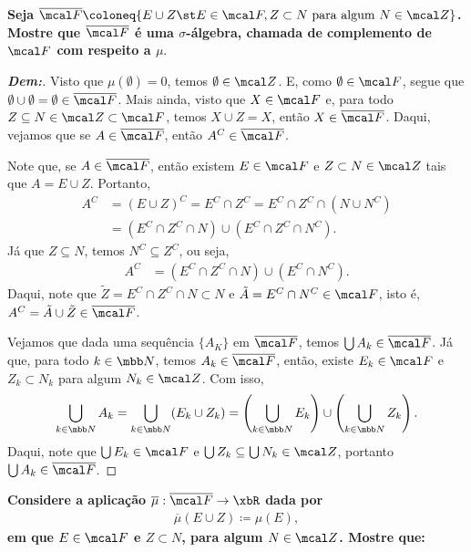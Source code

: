 \biglinend 
{}
\myexe{\thedois}
\bigline
\textbf{Seja $\overline{\mcal F} \coloneq \{E\cup Z\st E \in \mcal F, Z \subset N\text{ para algum }N\in \mcal Z\}$.
Mostre que $\overline{\mcal F}$ é uma $\sigma$-álgebra, chamada de complemento de $\mcal F$ com respeito a $\mu$}.
\begin{proof}[\textbf{Dem:}]
Visto que $\mu(\emptyset) = 0$, temos $\emptyset \in \mcal Z$. E, como $\emptyset \in \mcal F$, segue que 
  $\emptyset \cup \emptyset = \emptyset \in \overline{\mcal F}$. Mais ainda, visto que $X \in \mcal F$ e, 
  para todo $Z \subseteq N \in \mcal Z \subset \mcal F$, temos $X \cup Z = X$, então $X \in \overline{\mcal F}$. 
  Daqui, vejamos que se $A \in \overline{\mcal F}$, então $A^C \in \overline{\mcal F}$.
  
  \noindent 
  Note que, se $A \in \overline{\mcal F}$, então existem $E \in
  \mcal F$ e $Z \subset N\in\mcal Z$
  tais que $A = E \cup Z$. Portanto, 
  \begin{align*}
    A^C &= (E \cup Z)^C = E^C \cap Z^C = E^C\cap Z^C \cap (N \cup N^C)\\
    &= (E^C \cap Z^C \cap N) \cup (E^C \cap Z^C \cap N^C).
  \end{align*}
  Já que $Z \subseteq N$, temos $N^C \subseteq Z^C$, ou seja, 
  \begin{align*}
    A^C &= (E^C \cap Z^C \cap N) \cup (E^C \cap N^C).
  \end{align*}
  Daqui, note que $\tilde Z = E^C \cap Z^C \cap N \subset N$ e $\tilde A = E^C \cap N^C \in 
  \mcal F$, isto é, $A^C = \tilde A \cup \tilde Z \in \overline{\mcal F}$. 

  \noindent
  Vejamos que dada uma sequência $\{A_K\}$ em $\overline{\mcal F}$,
  temos $\bigcup A_k \in \overline{\mcal F}$. Já que, para todo 
  $k \in \mbb N$, temos $A_k \in \overline{\mcal F}$, então, existe $E_k \in \mcal F$ e 
  $Z_k \subset N_k$ para algum $N_k \in \mcal Z$. Com isso, 
  \begin{align*}
    \bigcup_{k \in \mbb N} A_k = \bigcup_{k \in \mbb N} (E_k \cup Z_k) = 
    \left(\bigcup_{k \in \mbb N} E_k \right)\cup \left(\bigcup_{k \in \mbb N} Z_k\right).
  \end{align*}
  Daqui, note que $\bigcup E_k \in \mcal F$ e $\bigcup Z_k \subseteq 
  \bigcup N_k \in \mcal Z$, portanto $\bigcup A_k \in \overline{\mcal F}$.
\end{proof}
\biglinend 
{}
\myexe{\thedois}
\bigline
\textbf{Considere a aplicação $\overline \mu: \overline{\mcal F} \rightarrow \xbR$ dada por 
\begin{align*}
  \overline \mu (E\cup Z) \coloneq \mu(E),
\end{align*}
em que $E\in \mcal F$ e $Z \subset N$, para algum $N \in \mcal Z$. Mostre que:} 
